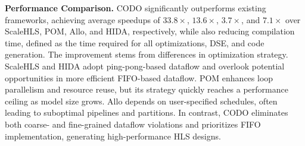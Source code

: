 \documentclass[conference]{IEEEtran}
\begin{document}
\textbf{Performance Comparison.} 
CODO significantly outperforms existing frameworks, achieving average speedups of $33.8\times$, $13.6\times$, $3.7\times$, and $7.1\times$ over ScaleHLS, POM, Allo, and HIDA, respectively, while also reducing compilation time, defined as the time required for all optimizations, DSE, and code generation. The improvement stems from differences in optimization strategy. ScaleHLS and HIDA adopt ping-pong-based dataflow and overlook potential opportunities in more efficient FIFO-based dataflow. POM enhances loop parallelism and resource reuse, but its strategy quickly reaches a performance ceiling as model size grows. Allo depends on user-specified schedules, often leading to suboptimal pipelines and partitions.
In contrast, CODO eliminates both coarse- and fine-grained dataflow violations and prioritizes FIFO implementation, generating high-performance HLS designs.


\end{document}
